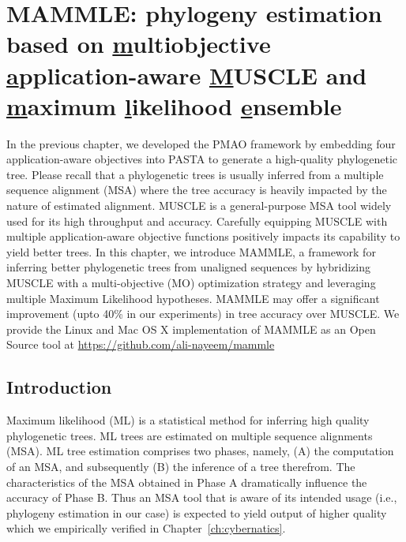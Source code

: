 
\graphicspath{{mammle/}}

\chapter{MAMMLE: phylogeny estimation based on \underline{m}ultiobjective \underline{a}pplication-aware \underline{M}USCLE and \underline{m}aximum \underline{l}ikelihood \underline{e}nsemble} \label{ch:mammle}


In the previous chapter, we developed the PMAO framework by embedding four application-aware objectives into PASTA to generate a high-quality phylogenetic tree.
Please recall that a phylogenetic trees is usually inferred from a multiple sequence alignment (MSA) where the tree accuracy is heavily impacted by the nature of estimated alignment. 
MUSCLE is a general-purpose MSA tool widely used for its high throughput and accuracy. Carefully equipping MUSCLE with multiple application-aware objective functions positively impacts its capability to yield better trees. In this chapter, we introduce MAMMLE, a framework for inferring better phylogenetic trees from unaligned sequences by hybridizing MUSCLE with a multi-objective (MO) optimization strategy and leveraging multiple Maximum Likelihood hypotheses. MAMMLE may offer a significant improvement (upto 40\% in our experiments) in tree accuracy over MUSCLE.
We provide the Linux and Mac OS X implementation of MAMMLE as an Open Source tool at \url{https://github.com/ali-nayeem/mammle}

\section{Introduction}
Maximum likelihood (ML) is a statistical method for inferring high quality phylogenetic trees. ML trees are estimated on multiple sequence alignments (MSA). ML tree estimation comprises two phases, namely, (A) the computation of an MSA, and subsequently (B) the inference of a tree therefrom. The characteristics of the MSA obtained in Phase A dramatically influence the accuracy of Phase B. Thus an MSA tool that is aware of its intended usage (i.e., phylogeny estimation in our case) is expected to yield output of higher quality which we empirically verified in Chapter~\ref{ch:cybernatics}.

